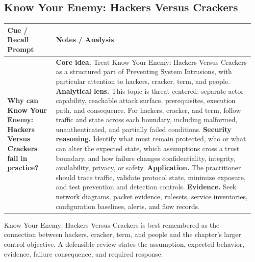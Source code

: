 \documentclass[11pt]{article}
\newcommand{\CornellHeader}{%
\rowcolor{Navy}\color{white}\bfseries Cue / Recall Prompt & \color{white}\bfseries Notes / Analysis\\\hline}
\newcommand{\CornellRow}[2]{%
\cellcolor{CueGray}\RaggedRight\textbf{#1} & \RaggedRight #2\\\hline}
\begin{document}
\subsection*{Know Your Enemy: Hackers Versus Crackers}
\begin{longtable}{>{\RaggedRight\arraybackslash}p{}|>{\RaggedRight\arraybackslash}p{}}
\CornellHeader
\CornellRow{Why can Know Your Enemy: Hackers Versus Crackers fail in practice?}{\textbf{Core idea.} Treat Know Your Enemy: Hackers Versus Crackers as a structured part of Preventing System Intrusions, with particular attention to hackers, cracker, term, and people. \textbf{Analytical lens.} This topic is threat-centered: separate actor capability, reachable attack surface, prerequisites, execution path, and consequence. For hackers, cracker, and term, follow traffic and state across each boundary, including malformed, unauthenticated, and partially failed conditions. \textbf{Security reasoning.} Identify what must remain protected, who or what can alter the expected state, which assumptions cross a trust boundary, and how failure changes confidentiality, integrity, availability, privacy, or safety. \textbf{Application.} The practitioner should trace traffic, validate protocol state, minimize exposure, and test prevention and detection controls. \textbf{Evidence.} Seek network diagrams, packet evidence, rulesets, service inventories, configuration baselines, alerts, and flow records.}
\end{longtable}
\begin{topicsummary}
Know Your Enemy: Hackers Versus Crackers is best remembered as the connection between hackers, cracker, term, and people and the chapter's larger control objective. A defensible review states the assumption, expected behavior, evidence, failure consequence, and required response.
\end{topicsummary}
\end{document}

